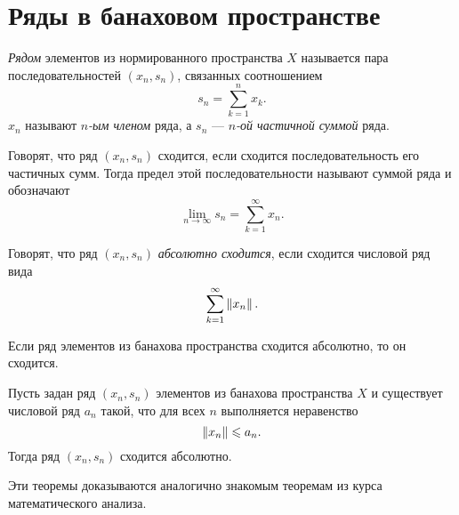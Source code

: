 \section{Ряды в банаховом пространстве}
\begin{definition}
    \emph{Рядом} элементов из нормированного пространства $X$ называется пара
    последовательностей $(x_n, s_n)$, связанных соотношением
    \[ s_n = \sum_{k=1}^n x_k. \]
    $x_n$ называют \emph{$n$-ым членом} ряда, а $s_n$ --- \emph{$n$-ой частичной
    суммой} ряда.
\end{definition}

\begin{definition}
    Говорят, что ряд $(x_n, s_n)$ сходится, если сходится последовательность его
    частичных сумм. Тогда предел этой последовательности называют суммой ряда и
    обозначают
    \[ \lim_{n\to\infty} s_n = \sum_{k=1}^\infty x_n. \]
\end{definition}

\begin{definition}
    Говорят, что ряд $(x_n, s_n)$ \emph{абсолютно сходится}, если сходится числовой ряд
    вида
    \[ \sum_{k=1}^\infty \left\|x_n\right\|. \]
\end{definition}

\begin{theorem}
    Если ряд элементов из банахова пространства 
    сходится абсолютно, то он сходится.
\end{theorem}

\begin{theorem}
    Пусть задан ряд $(x_n, s_n)$ элементов из банахова пространства $X$ и
    существует числовой ряд $a_n$ такой, что для всех $n$ выполняется
    неравенство
    \[ \left\|x_n\right\| \leqslant a_n. \]
    Тогда ряд $(x_n, s_n)$ сходится абсолютно.
\end{theorem}

Эти теоремы доказываются аналогично знакомым теоремам из курса математического
анализа.

